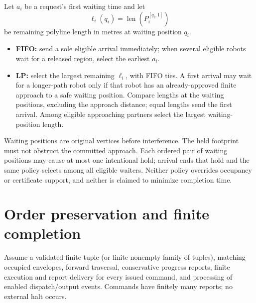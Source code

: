 \documentclass[11pt,a4paper]{article}
\theoremstyle{remark}
\newcounter{algorithm}
\begin{document}
Let $a_i$ be a request's first waiting time and let
\begin{equation}
 \ell_i(q_i)=\operatorname{len}(P_i^{[q_i,1]})
 \label{eq:policy-length}
\end{equation}
be remaining polyline length in metres at waiting position $q_i$.
\begin{itemize}
\item \textbf{FIFO:} send a sole eligible arrival immediately; when several
eligible robots wait for a released region, select the earliest $a_i$.
\item \textbf{LP:} select the largest remaining $\ell_i$, with FIFO ties.
A first arrival may wait for a longer-path robot only if that robot has an
already-approved finite approach to a safe waiting position. Compare lengths
at the waiting positions, excluding the approach distance; equal lengths
send the first arrival. Among eligible approaching partners select the
largest waiting-position length.
\end{itemize}
Waiting positions are original vertices before interference. The held
footprint must not obstruct the committed approach. Each ordered pair of
waiting positions may cause at most one intentional hold; arrival ends
that hold and the same policy selects among all eligible waiters.
Neither policy overrides occupancy or certificate support, and neither
is claimed to minimize completion time.

\section{Order preservation and finite completion}
\label{sec:control-guarantees}
\label{sec:algorithm-proof}
Assume a validated finite tuple (or finite nonempty family of tuples),
matching occupied envelopes, forward traversal, conservative progress
reports, finite execution and report delivery for every issued command,
and processing of enabled dispatch/output events. Commands have finitely
many reports; no external halt occurs.
\end{document}
